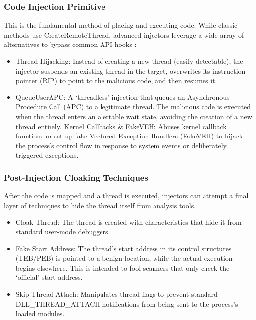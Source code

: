 \documentclass[journal]{IEEEtran}
\begin{document}
\subsubsection{Code Injection Primitive}
This is the fundamental method of placing and executing code. While classic methods use CreateRemoteThread, advanced injectors leverage a wide array of alternatives to bypass common API hooks \cite{elastic2023injection}:
\begin{itemize}
\item Thread Hijacking: Instead of creating a new thread (easily detectable), the injector suspends an existing thread in the target, overwrites its instruction pointer (RIP) to point to the malicious code, and then resumes it.
\item QueueUserAPC: A `threadless' injection that queues an Asynchronous Procedure Call (APC) to a legitimate thread. The malicious code is executed when the thread enters an alertable wait state, avoiding the creation of a new thread entirely. Kernel Callbacks \& FakeVEH: Abuses kernel callback functions or set up fake Vectored Exception Handlers (FakeVEH) to hijack the process's control flow in response to system events or deliberately triggered exceptions.
\end{itemize}
\subsubsection{Post-Injection Cloaking Techniques}
After the code is mapped and a thread is executed, injectors can attempt a final layer of techniques to hide the thread itself from analysis tools.
\begin{itemize}
\item Cloak Thread: The thread is created with characteristics that hide it from standard user-mode debuggers.
\item Fake Start Address: The thread's start address in its control structures (TEB/PEB) is pointed to a benign location, while the actual execution begins elsewhere. This is intended to fool scanners that only check the `official' start address.
\item Skip Thread Attach: Manipulates thread flags to prevent standard DLL\_THREAD\_ATTACH notifications from being sent to the process's loaded modules.
\end{itemize}
\end{document}
